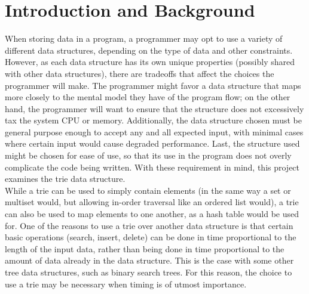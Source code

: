 \documentclass{llncs}
\begin{document}
\section{Introduction and Background}
\label{Introduction and Background}
When storing data in a program, a programmer may opt to use a variety of different data structures, depending on the type of data and other constraints. However, as each data structure has its own unique properties (possibly shared with other data structures), there are tradeoffs that affect the choices the programmer will make. The programmer might favor a data structure that maps more closely to the mental model they have of the program flow; on the other hand, the programmer will want to ensure that the structure does not excessively tax the system CPU or memory. Additionally, the data structure chosen must be general purpose enough to accept any and all expected input, with minimal cases where certain input would cause degraded performance. Last, the structure used might be chosen for ease of use, so that its use in the program does not overly complicate the code being written. With these requirement in mind, this project examines the trie data structure.\\

While a trie can be used to simply contain elements (in the same way a set or multiset would, but allowing in-order traversal like an ordered list would), a trie can also be used to map elements to one another, as a hash table would be used for. One of the reasons to use a trie over another data structure is that certain basic operations (search, insert, delete) can be done in time proportional to the length of the input data, rather than being done in time proportional to the amount of data already in the data structure. This is the case with some other tree data structures, such as binary search trees. For this reason, the choice to use a trie may be necessary when timing is of utmost importance. \\
\end{document}
